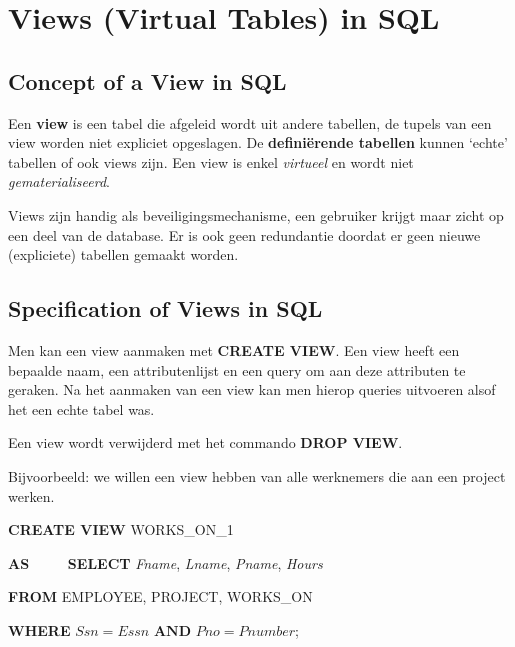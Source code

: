 \section{Views (Virtual Tables) in SQL}
\subsection{Concept of a View in SQL}
Een \textbf{view} is een tabel die afgeleid wordt uit andere tabellen, de tupels van een view worden niet expliciet opgeslagen. De \textbf{defini\"erende tabellen} kunnen `echte' tabellen of ook views zijn. Een view is enkel \textit{virtueel} en wordt niet \textit{gematerialiseerd}.

Views zijn handig als beveiligingsmechanisme, een gebruiker krijgt maar zicht op een deel van de database. Er is ook geen redundantie doordat er geen nieuwe (expliciete) tabellen gemaakt worden.


\subsection{Specification of Views in SQL}
Men kan een view aanmaken met \textbf{CREATE VIEW}. Een view heeft een bepaalde naam, een attributenlijst en een query om aan deze attributen te geraken. Na het aanmaken van een view kan men hierop queries uitvoeren alsof het een echte tabel was.

Een view wordt verwijderd met het commando \textbf{DROP VIEW}.

\noindent Bijvoorbeeld: we willen een view hebben van alle werknemers die aan een project werken.

\vspace{1mm}\hspace{10mm}
\textbf{CREATE VIEW} WORKS\_ON\_1

\hspace{10mm}
\textbf{AS $\qquad$ SELECT} \textit{Fname}, \textit{Lname}, \textit{Pname}, \textit{Hours}

\hspace{10mm}
 \textbf{FROM} EMPLOYEE, PROJECT, WORKS\_ON

\hspace{10mm}
 \textbf{WHERE} $\textit{Ssn} = \textit{Essn} \textbf{ AND } \textit{Pno} = \textit{Pnumber}$;


